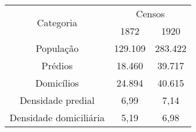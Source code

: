 \begin{table}[!htp]
{
\begin{tabular}{|c|c|c|}
\hline 
\multirow{2}{*}{Categoria} & \multicolumn{2}{c|}{Censos} \\ 
\cline{2-3} 
 & 1872 & 1920 \\ 
\hline 
População & 129.109 & 283.422 \\ 
\hline 
Prédios & 18.460 & 39.717 \\ 
\hline 
Domicílios & 24.894 & 40.615 \\ 
\hline 
Densidade predial & 6,99 & 7,14 \\ 
\hline 
Densidade domiciliária & 5,19 & 6,98 \\ 
\hline 
\end{tabular} 
}
{}
\end{table}